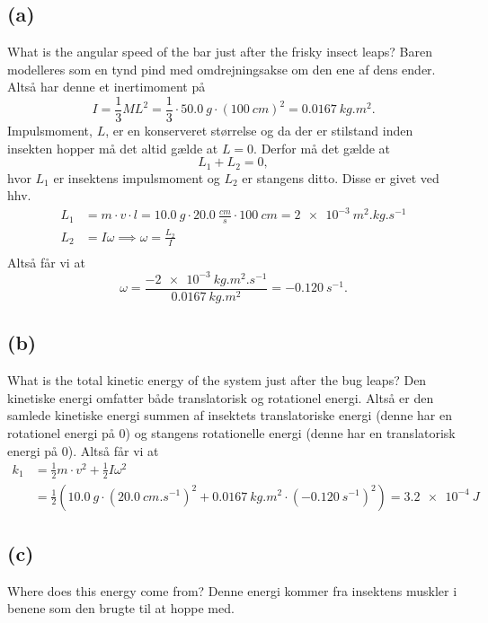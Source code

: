 \documentclass[12pt]{article}
\begin{document}
\subsection*{(a)}
What is the angular speed of the bar just after the frisky insect leaps?
\bigbreak
Baren modelleres som en tynd pind med omdrejningsakse om den ene af dens ender. Altså har denne et inertimoment på
\[
I = \frac{1}{3}ML^2 = \frac{1}{3}\cdot \qty{50,0}{g} \cdot (\qty{100}{cm})^2 = \qty{0,0167}{kg.m^2} 
.\]
Impulsmoment, $L$, er en konserveret størrelse og da der er stilstand inden insekten hopper må det altid gælde at $L=0$. Derfor må det gælde at
\[
  L_1 + L_2 = 0    
,\]
hvor $L_1$ er insektens impulsmoment og $L_2$ er stangens ditto. Disse er givet ved hhv.
\begin{align*}
  L_1 &= m\cdot v\cdot l = \qty{10,0}{g} \cdot \qty{20,0}{\frac{cm}{s}} \cdot \qty{100}{cm} = \qty{2e-3}{m^2.kg.s^{-1}}   \\
  L_2 &= I\omega \implies \omega = \frac{L_2}{I}\\
\end{align*}
Altså får vi at
\[
  \omega = \frac{- \qty{2e-3}{kg.m^2.s^{-1}}}{\qty{0,0167}{kg.m^2}} = \qty{-0,120}{s^{-1}} 
.\]


\subsection*{(b)}
What is the total kinetic energy of the system just after the bug leaps?
\bigbreak
Den kinetiske energi omfatter både translatorisk og rotationel energi. Altså er den samlede kinetiske energi summen af insektets translatoriske energi (denne har en rotationel energi på 0) og stangens rotationelle energi (denne har en translatorisk energi på 0). Altså får vi at
\begin{align*}
  k_1 &= \frac{1}{2}m\cdot v^2 + \frac{1}{2}I\omega^2 \\
  &= \frac{1}{2}\left( \qty{10,0}{g} \cdot \left( \qty{20,0}{cm.s^{-1}}\right)^2 + \qty{0,0167}{kg.m^2}\cdot \left( \qty{-0,120}{s^{-1} }  \right)^2   \right) = \qty{3,2e-4}{J}  
\end{align*}


\subsection*{(c)}
Where does this energy come from?
\bigbreak
Denne energi kommer fra insektens muskler i benene som den brugte til at hoppe med.
\end{document}
